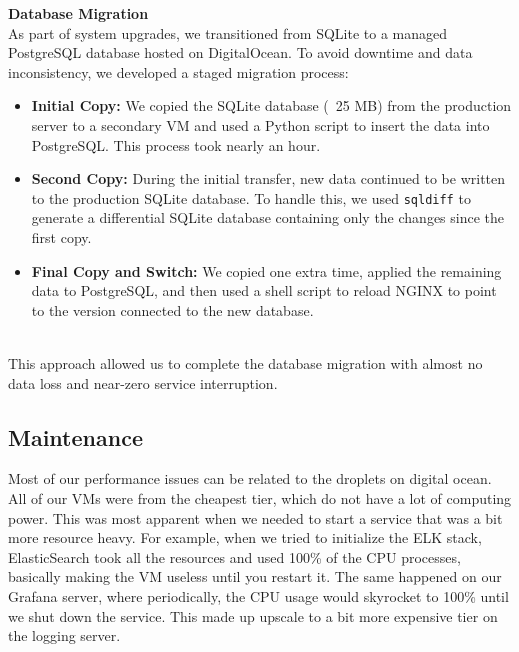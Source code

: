 \noindent \textbf{Database Migration}
\\

As part of system upgrades, we transitioned from SQLite to a managed PostgreSQL database hosted on DigitalOcean. To avoid downtime and data inconsistency, we developed a staged migration process:
\begin{itemize}
    \item \textbf{Initial Copy:} We copied the SQLite database (~25 MB) from the production server to a secondary VM and used a Python script to insert the data into PostgreSQL. This process took nearly an hour.
    \item \textbf{Second Copy:} During the initial transfer, new data continued to be written to the production SQLite database. To handle this, we used \texttt{sqldiff} to generate a differential SQLite database containing only the changes since the first copy.
    \item \textbf{Final Copy and Switch:} We copied one extra time, applied the remaining data to PostgreSQL, and then used a shell script to reload NGINX to point to the version connected to the new database.
\end{itemize}
\\

This approach allowed us to complete the database migration with almost no data loss and near-zero service interruption.

\subsection{Maintenance}

Most of our performance issues can be related to the droplets on digital ocean. All of our VMs were from the cheapest tier, which do not have a lot of computing power. This was most apparent when we needed to start a service that was a bit more resource heavy. For example, when we tried to initialize the ELK stack, ElasticSearch took all the resources and used 100\% of the CPU processes, basically making the VM useless until you restart it. The same happened on our Grafana server, where periodically, the CPU usage would skyrocket to 100\% until we shut down the service. This made up upscale to a bit more expensive tier on the logging server.
\\

